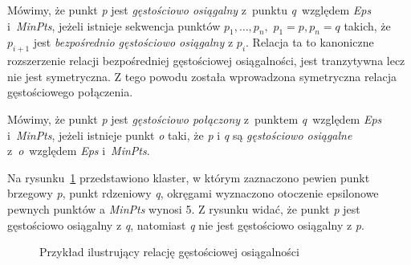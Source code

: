 \newpage
Mówimy, że punkt \emph{p} jest \emph{gęstościowo osiągalny} z~punktu \emph{q}~względem \emph{Eps} i~\emph{MinPts}, jeżeli istnieje sekwencja punktów $p_{1}, \ldots, p_{n},$ $p_{1}=p, p_{n}=q$ takich, że $p_{i+1}$ jest \emph{bezpośrednio gęstościowo osiągalny} z $p_{i}$. Relacja ta to kanoniczne rozszerzenie relacji bezpośredniej gęstościowej osiągalności, jest tranzytywna lecz nie jest symetryczna. Z tego powodu została wprowadzona symetryczna relacja gęstościowego połączenia.

Mówimy, że punkt \emph{p} jest \emph{gęstościowo połączony} z~punktem \emph{q}~względem \emph{Eps} i~\emph{MinPts}, jeżeli istnieje punkt \emph{o} taki, że \emph{p} i \emph{q} są \emph{gęstościowo osiągalne} z~\emph{o}~względem \emph{Eps} i~\emph{MinPts}.

Na rysunku~\ref{rys:2} przedstawiono  klaster, w którym zaznaczono pewien punkt brzegowy \emph{p}, punkt rdzeniowy \emph{q}, okręgami wyznaczono otoczenie epsilonowe pewnych punktów a \emph{MinPts} wynosi 5. Z rysunku widać, że punkt \emph{p} jest  gęstościowo osiągalny z \emph{q}, natomiast \emph{q} nie jest gęstościowo osiągalny z \emph{p}.
\begin{figure}[!h]
\begin{center}
\end{center}
\caption{Przykład ilustrujący relację gęstościowej osiągalności\label{rys:2}}
\end{figure}

